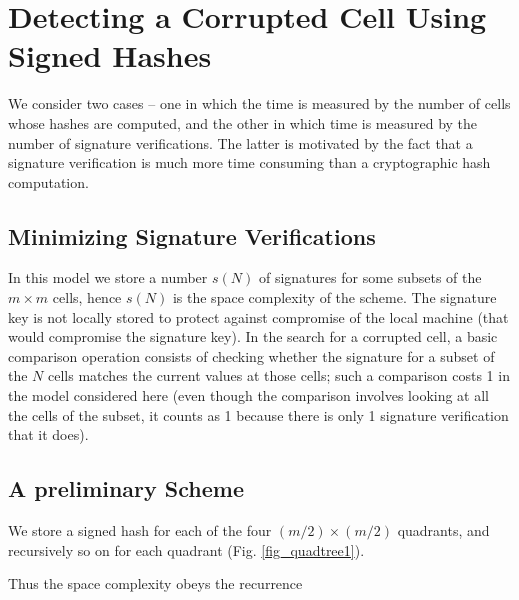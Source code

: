 \documentclass{llncs}
\begin{document}
\section{Detecting a Corrupted Cell Using Signed Hashes}
\label{Model2}

We consider two cases -- one in which the time is measured
by the number of cells whose hashes are computed, and the other in which
time is measured by the number of signature verifications.
The latter is motivated by the fact that a signature verification is 
much more time consuming than a cryptographic hash computation.

\subsection{Minimizing Signature Verifications}
\label{SignedHashes}
In this model we store a number $s(N)$ of signatures for 
some subsets of the $m \times m$ cells, hence $s(N)$
is the space complexity of the scheme.   The signature
key is not locally stored to protect against compromise of 
the local machine (that would compromise the signature key).
In the search for
a corrupted cell, a basic comparison operation consists of
checking whether the signature for a subset of the $N$ cells
matches the current values at those cells; such a comparison
costs 1 in the model considered here (even though the comparison
involves looking at all the cells of the subset, it counts
as 1 because there is only 1 signature verification that it
does).

\subsection{A preliminary Scheme}
\label{PreliminaryScheme}

We store a signed hash for each of the four $(m/2) \times (m/2)$ 
quadrants, and recursively so on for each quadrant (Fig. \ref{fig_quadtree1}).  

\begin{figure*}
\centerline{
\hfil
{}}
\caption{Preliminary Method}
\label{fig_quadtree1}
\end{figure*}

Thus the
space complexity obeys the recurrence
\end{document}
